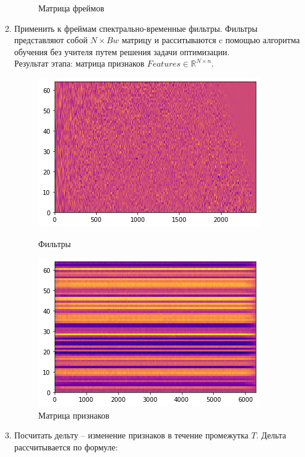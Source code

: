 \begin{enumerate}[label=\arabic*.]
\begin{figure}[H]
\begin{center}
            \caption{Матрица фреймов}
        \end{center}
    \end{figure}
    \item Применить к фреймам спектрально-временные фильтры. Фильтры представляют собой
    $N \times Bw$ матрицу и расситываются c помощью алгоритма обучения без учителя
    путем решения задачи оптимизации.\\
    Результат этапа: матрица признаков $Features \in \mathbb{R}^{N \times n}$.
    \begin{figure}[H]
        \begin{minipage}{.5\textwidth}
            \centering
            \includegraphics[scale=0.6]{inc/img/filters.png}
            \caption{Фильтры}
        \end{minipage}%
        \begin{minipage}{.5\textwidth}
            \centering
            \includegraphics[scale=0.6]{inc/img/features.png}
            \caption{Матрица признаков}
        \end{minipage}
    \end{figure}
    \item Посчитать дельту -- изменение признаков в течение промежутка $T$.
    Дельта рассчитывается по формуле:

\end{enumerate}
